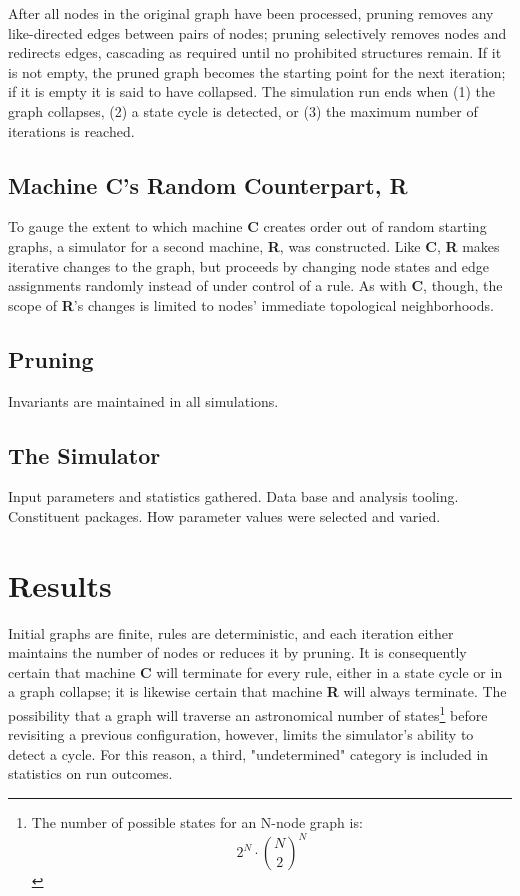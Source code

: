 \documentclass[twoside,twocolumn]{article}
\begin{document}
After all nodes in the original graph have been processed, pruning removes
any like-directed edges between pairs of nodes; pruning selectively removes nodes
and redirects edges, cascading as required until no prohibited structures remain.
If it is not empty, the pruned graph becomes the starting point for the next iteration;
if it is empty it is said to have collapsed.
The simulation run ends when (1) the graph collapses, (2) a state cycle is detected,
or (3) the maximum number of iterations is reached.

\subsection{Machine \textbf{C}'s Random Counterpart, \textbf{R}}

To gauge the extent to which machine \textbf{C} creates order out of
random starting graphs, a simulator for a second machine, \textbf{R},
was constructed. Like \textbf{C}, \textbf{R} makes iterative changes to the
graph, but proceeds by changing node states and edge assignments randomly
instead of under control of a rule. As with \textbf{C}, though, the scope
of \textbf{R}'s changes is limited to nodes' immediate topological neighborhoods.

\subsection{Pruning}

Invariants are maintained in all simulations.

\subsection{The Simulator}

Input parameters and statistics gathered. Data base and analysis tooling.
Constituent packages. How parameter values were selected and varied.


\section{Results}

Initial graphs are finite, rules are deterministic, and each iteration
either maintains the number of nodes or reduces it by pruning.
It is consequently certain that machine \textbf{C} will terminate for every rule,
either in a state cycle or in a graph collapse; it is likewise certain that
machine \textbf{R} will always terminate.
The possibility that a graph will traverse an astronomical number
of states\footnote{The number of possible states for an N-node graph is:
\[
2^N\cdot\binom{N}{2}^N
\]
}
before revisiting a previous configuration, however, limits the simulator's ability to
detect a cycle. For this reason, a third, "undetermined" category is included in
statistics on run outcomes.
\end{document}
